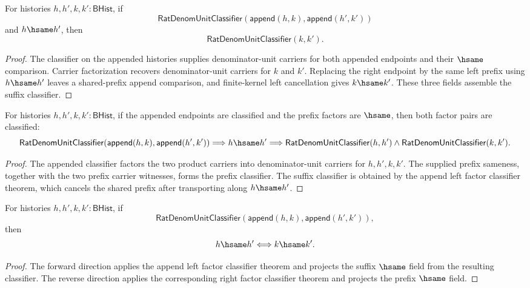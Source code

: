 \begin{theorem}
\label{thm:rat-denom-unit-classifier-append-left-factor-classifier}
For histories $h,h',k,k':\mathsf{BHist}$, if
$$
\mathsf{RatDenomUnitClassifier}(\mathsf{append}(h,k),\mathsf{append}(h',k'))
$$
and $h\hsame h'$, then
$$
\mathsf{RatDenomUnitClassifier}(k,k').
$$
\end{theorem}
\begin{proof}
The classifier on the appended histories supplies denominator-unit carriers for
both appended endpoints and their $\hsame$ comparison. Carrier factorization
recovers denominator-unit carriers for $k$ and $k'$. Replacing the right
endpoint by the same left prefix using $h\hsame h'$ leaves a shared-prefix
append comparison, and finite-kernel left cancellation gives $k\hsame k'$.
These three fields assemble the suffix classifier.
\end{proof}

\begin{theorem}
\label{thm:rat-denom-unit-classifier-append-prefix-factor-classifiers}
For histories $h,h',k,k':\mathsf{BHist}$, if the appended endpoints are
classified and the prefix factors are $\hsame$, then both factor pairs are
classified:
$$
\mathsf{RatDenomUnitClassifier}(\mathsf{append}(h,k),\mathsf{append}(h',k'))
\Longrightarrow
h\hsame h'
\Longrightarrow
\mathsf{RatDenomUnitClassifier}(h,h')\land
\mathsf{RatDenomUnitClassifier}(k,k').
$$
\end{theorem}
\begin{proof}
The appended classifier factors the two product carriers into
denominator-unit carriers for $h,h',k,k'$. The supplied prefix sameness,
together with the two prefix carrier witnesses, forms the prefix classifier.
The suffix classifier is obtained by the append left factor classifier theorem,
which cancels the shared prefix after transporting along $h\hsame h'$.
\end{proof}

\begin{theorem}
\label{thm:rat-denom-unit-classifier-append-factor-hsame-iff}
For histories $h,h',k,k':\mathsf{BHist}$, if
$$
\mathsf{RatDenomUnitClassifier}(\mathsf{append}(h,k),\mathsf{append}(h',k')),
$$
then
$$
h\hsame h' \Longleftrightarrow k\hsame k'.
$$
\end{theorem}
\begin{proof}
The forward direction applies the append left factor classifier theorem and
projects the suffix $\hsame$ field from the resulting classifier. The reverse
direction applies the corresponding right factor classifier theorem and
projects the prefix $\hsame$ field.
\end{proof}

